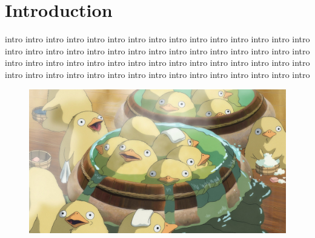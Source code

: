 \chapter*{Introduction}

intro intro intro intro intro intro intro intro intro intro intro intro intro intro intro intro intro intro intro intro intro intro intro intro intro intro intro intro intro intro intro intro intro intro intro intro intro intro intro intro intro intro intro intro intro intro intro intro intro intro intro intro intro intro intro intro intro intro intro intro 

\begin{figure}[H]
    \centering
    \hspace{5 em}
    \includegraphics[width=0.75\linewidth]{figs/quack.jpg}
    \caption{}
    \label{fig:cv_tray}
\end{figure}